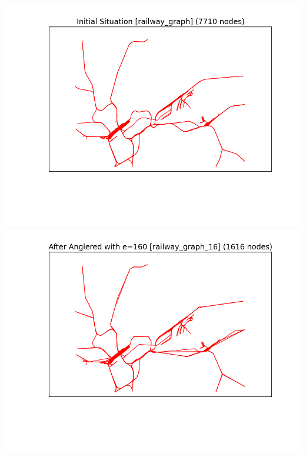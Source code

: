 \documentclass[twoside]{scrartcl}
\begin{document}
\includegraphics[scale=0.49]{anglered-1.png}
\includegraphics[scale=0.49]{anglered-2.png}
\end{document}
